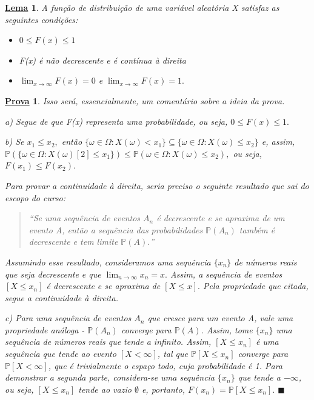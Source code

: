 \documentclass{article}
\newtheorem*{lemma*}{\underline{Lema}}
\newtheorem*{proof*}{\underline{Prova}}
\renewcommand\qedsymbol{$\blacksquare$}
\begin{document}
\begin{lemma*}
  A função de distribuição de uma variável aleatória X satisfaz as seguintes condições:
 \begin{itemize}
   \item[a)] \(0\leq F(x)\leq 1\)
   \item[b)] F(x) é não decrescente e é contínua à direita
   \item[c)] \(\lim_{x\to \infty}F(x) = 0\) e \(\lim_{x\to \infty}F(x) = 1.\)
 \end{itemize}
\end{lemma*}
\begin{proof*}
  Isso será, essencialmente, um comentário sobre a ideia da prova.

  a) Segue de que F(x) representa uma probabilidade, ou seja, \(0\leq F(x)\leq 1.\)

  b) Se \(x_{1}\leq x_{2},\) então \(\{\omega \in \Omega : X(\omega ) < x_{1}\}\subseteq{\{\omega \in \Omega : X(\omega )\leq x_{2}\}}\) e, assim, \(\mathbb{P}(\{\omega \in \Omega : X(\omega )[2]\leq x_{1}\})\leq 
  \mathbb{P}(\omega \in \Omega : X(\omega )\leq x_{2}),\) ou seja, \(F(x_{1})\leq F(x_{2}).\)

  Para provar a continuidade à direita, seria preciso o seguinte resultado que sai do escopo do curso:
 \begin{quote}
   ``Se uma sequência de eventos \(A_{n}\) é decrescente e se aproxima de um evento A, então a sequência
   das probabilidades \(\mathbb{P}(A_{n})\) também é decrescente e tem limite \(\mathbb{P}(A).\)''
 \end{quote}
 Assumindo esse resultado, consideramos uma sequência \(\{x_{n}\}\) de números reais que seja decrescente e que
 \(\lim_{n\to \infty}x_{n} = x.\)  Assim, a sequência de eventos \([X\leq x_{n}]\) é decrescente e se aproxima de \([X\leq x].\) 
 Pela propriedade que citada, segue a continuidade à direita.

 c) Para uma sequência de eventos \(A_{n}\) que cresce para um evento A, vale uma propriedade análoga - 
\(\mathbb{P}(A_{n})\) converge para \(\mathbb{P}(A)\). Assim, tome \(\{x_{n}\}\) uma sequência de números reais
que tende a infinito. Assim, \([X\leq x_{n}]\) é uma sequência que tende ao evento \([X < \infty]\), tal que \(\mathbb{P}[X\leq x_{n}]\) 
converge para \(\mathbb{P}[X <\infty]\), que é trivialmente o espaço todo, cuja probabilidade é 1. Para demonstrar a segunda parte,
considera-se uma sequência \(\{x_{n}\}\) que tende a \(-\infty\), ou seja, \([X\leq x_{n}]\) tende ao vazio \(\emptyset\) e, portanto,
 \(F(x_{n}) = \mathbb{P}[X\leq x_{n}].\) \qedsymbol
\end{proof*}
\end{document}
